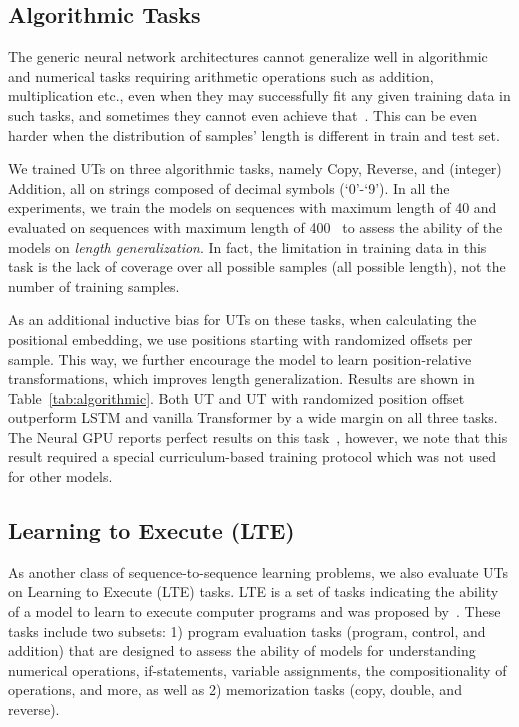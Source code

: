 \subsection{Algorithmic Tasks}
The generic neural network architectures cannot generalize well in algorithmic and numerical tasks requiring arithmetic operations such as addition, multiplication etc., even when they may successfully fit any given training data in such tasks, and sometimes they cannot even achieve that~\citep{trask2018neural}. This can be even harder when the distribution of samples' length is different in train and test set.

We trained UTs on three algorithmic tasks, namely Copy, Reverse, and (integer) Addition, all on strings composed of decimal symbols (`0'-`9'). In all the experiments, we train the models on sequences with maximum length of 40 and evaluated on sequences with maximum length of 400~\citep{neural_gpu} to assess the ability of the models on \emph{length generalization}. In fact, the limitation in training data in this task is the lack of coverage over all possible samples (all possible length), not the number of training samples.

As an additional inductive bias for UTs on these tasks, when calculating the positional embedding, we use positions starting with randomized offsets per sample. This way, we further encourage the model to learn position-relative transformations, which improves length generalization.
Results are shown in Table~\ref{tab:algorithmic}. Both UT and UT with randomized position offset outperform LSTM and vanilla Transformer by a wide margin on all three tasks. 
The Neural GPU reports perfect results on this task~\citep{neural_gpu}, however, we note that this result required a special curriculum-based training protocol which was not used for other models.



\subsection{Learning to Execute (LTE)}
As another class of sequence-to-sequence learning problems, we also evaluate UTs on Learning to Execute (LTE) tasks. 
LTE is a set of tasks indicating the ability of a model to learn to execute computer programs and was proposed by~\citet{ZS14}. These tasks include two subsets: 1) program evaluation tasks (program, control, and addition) that are designed to assess the ability of models for understanding numerical operations, if-statements, variable assignments, the compositionality of operations, and more, as well as 2) memorization tasks (copy, double, and reverse). 

